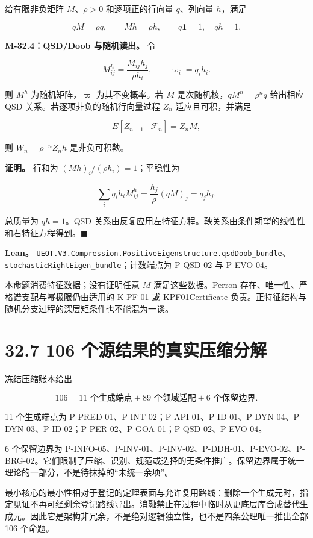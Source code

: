 \documentclass[
  11pt,
  oneside]{book}
\begin{document}
给有限非负矩阵 \(M\)、\(\rho>0\) 和逐项正的行向量 \(q\)、列向量 \(h\)，满足

\[qM=\rho q,\qquad Mh=\rho h,\qquad q\mathbf1=1,\quad qh=1.\]

\hypertarget{m-32-4}{}\label{m-32-4}

\textbf{M-32.4：QSD/Doob 与随机读出。} 令

\[M^h_{ij}=\frac{M_{ij}h_j}{\rho h_i},\qquad \varpi_i=q_ih_i.\]

则 \(M^h\) 为随机矩阵，\(\varpi\) 为其不变概率。若 \(M\) 是次随机核，\(qM^n=\rho^nq\) 给出相应 QSD 关系。若逐项非负的随机行向量过程 \(Z_n\) 适应且可积，并满足

\[E[Z_{n+1}\mid\mathcal F_n]=Z_nM,\]

则 \(W_n=\rho^{-n}Z_nh\) 是非负可积鞅。

\textbf{证明。} 行和为 \((Mh)_i/(\rho h_i)=1\)；平稳性为

\[\sum_iq_ih_iM^h_{ij}=\frac{h_j}{\rho}(qM)_j=q_jh_j.\]

总质量为 \(qh=1\)。QSD 关系由反复应用左特征方程。鞅关系由条件期望的线性性和右特征方程得到。\(\blacksquare\)

\textbf{Lean。} \nolinkurl{UEOT.V3.Compression.PositiveEigenstructure.qsdDoob_bundle}、\nolinkurl{stochasticRightEigen_bundle}；计数端点为 P-QSD-02 与 P-EVO-04。

本命题消费特征数据；没有证明任意 \(M\) 满足这些数据。Perron 存在、唯一性、严格谱支配与幂极限仍由适用的 K-PF-01 或 KPF01Certificate 负责。正特征结构与随机分支过程的深层矩条件也不能混为一谈。

\section{32.7 106 个源结果的真实压缩分解}\label{ux4e2aux6e90ux7ed3ux679cux7684ux771fux5b9eux538bux7f29ux5206ux89e3}

冻结压缩账本给出

\[106=11\text{ 个生成端点}+89\text{ 个领域适配}+6\text{ 个保留边界}.\]

11 个生成端点为 P-PRED-01、P-INT-02；P-API-01、P-ID-01、P-DYN-04、P-DYN-03、P-ID-02；P-PER-02、P-GOA-01；P-QSD-02、P-EVO-04。

6 个保留边界为 P-INFO-05、P-INV-01、P-INV-02、P-DDH-01、P-EVO-02、P-BRG-02。它们限制了压缩、识别、规范或选择的无条件推广。保留边界属于统一理论的一部分，不是待抹掉的``未统一余项''。

最小核心的最小性相对于登记的定理表面与允许复用路线：删除一个生成元时，指定见证不再可经剩余登记路线导出。消融禁止在过程中临时从更底层库合成替代生成元。因此它是架构非冗余，不是绝对逻辑独立性，也不是四条公理唯一推出全部 106 个命题。
\end{document}
